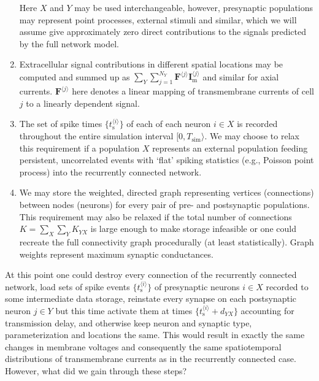 \begin{enumerate}
Here $X$ and $Y$ may be used interchangeable, however, 
presynaptic populations may represent point processes, external stimuli and similar, which we will assume give approximately zero direct contributions to the signals predicted by the full network model.
\item Extracellular signal contributions in different spatial locations may be computed and summed up as 
$\sum_Y \sum_{j=1}^{N_Y} \mathbf{F}^{\langle j \rangle} \mathbf{I}_\mathrm{m}^{\langle j \rangle}$ and similar for axial currents. 
$\mathbf{F}^{\langle j \rangle}$ here denotes a linear mapping of transmembrane currents of cell $j$ to a linearly dependent signal.  
\item The set of spike times $\{ t_\mathrm{s}^{\langle i \rangle} \}$ of each of each neuron $i \in X$ is recorded throughout the entire simulation interval $[0, T_\mathrm{sim} \rangle$. 
We may choose to relax this requirement if a population $X$ represents an external population feeding persistent, uncorrelated events with `flat' spiking statistics (e.g., Poisson point process) into the recurrently connected network. 
\item We may store the weighted, directed graph representing vertices (connections) between nodes (neurons) for every pair of pre- and postsynaptic populations. 
This requirement may also be relaxed if the total number of connections $K = \sum_X \sum_Y K_{YX}$ is large enough to make storage infeasible or one could recreate the full connectivity graph procedurally (at least statistically). 
Graph weights represent maximum synaptic conductances. 
\end{enumerate}

At this point one could destroy every connection of the recurrently connected network, 
load sets of spike events $\{ t_\mathrm{s}^{\langle i \rangle} \}$ of presynaptic neurons $i \in X$ recorded to some intermediate data storage, 
reinstate every synapse on each postsynaptic neuron $j \in Y$ but this time activate them at times $\{ t_\mathrm{s}^{\langle i \rangle} + d_{YX} \}$ accounting for transmission delay, 
and otherwise keep neuron and synaptic type, parameterization and locations the same. 
This would result in exactly the same changes in membrane voltages and consequently the same spatiotemporal distributions of transmembrane currents as in the recurrently connected case. 
However, what did we gain through these steps?

